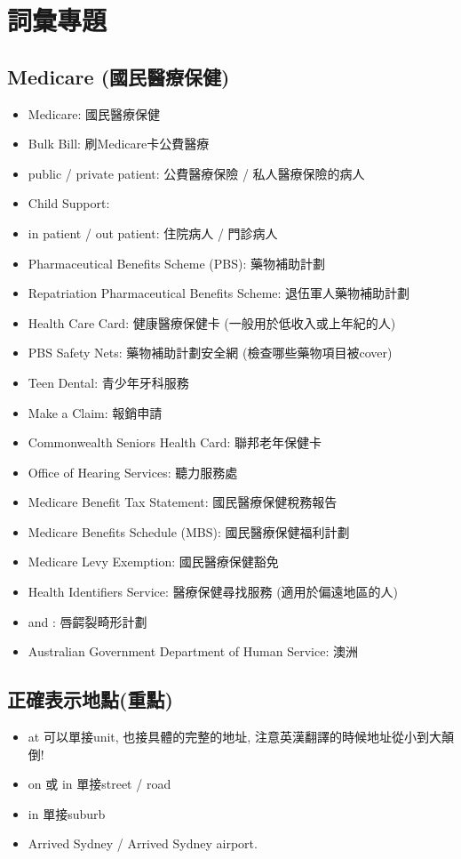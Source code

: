 \section{詞彙專題}
\subsection{Medicare (國民醫療保健)}
\begin{itemize}
  \itemsep0em
  \item Medicare: 國民醫療保健
  \item Bulk Bill: 刷Medicare卡公費醫療
  \item public / private patient: 公費醫療保險 / 私人醫療保險的病人
  \item Child Support: 
  \item in patient / out patient: 住院病人 / 門診病人
  \item Pharmaceutical Benefits Scheme (PBS): 藥物補助計劃
  \item Repatriation Pharmaceutical Benefits Scheme: 退伍軍人藥物補助計劃
  \item Health Care Card: 健康醫療保健卡 (一般用於低收入或上年紀的人)
  \item PBS Safety Nets: 藥物補助計劃安全網 (檢查哪些藥物項目被cover)
  \item Teen Dental: 青少年牙科服務
  \item Make a Claim: 報銷申請
  \item Commonwealth Seniors Health Card: 聯邦老年保健卡
  \item Office of Hearing Services: 聽力服務處
  \item Medicare Benefit Tax Statement: 國民醫療保健稅務報告
  \item Medicare Benefits Schedule (MBS): 國民醫療保健福利計劃
  \item Medicare Levy Exemption: 國民醫療保健豁免
  \item Health Identifiers Service: 醫療保健尋找服務 (適用於偏遠地區的人)
  \item {} and : 唇齶裂畸形計劃
  \item Australian Government Department of Human Service: 澳洲
\end{itemize}

\subsection{正確表示地點(重點)}
\begin{itemize}
  \itemsep0em
  \item at 可以單接unit, 也接具體的完整的地址, 注意英漢翻譯的時候地址從小到大顛倒!
  \item on 或 in 單接street / road
  \item in 單接suburb
  \item Arrived  Sydney / Arrived  Sydney airport.
\end{itemize}

